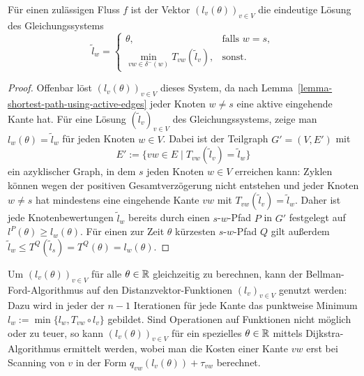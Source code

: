 \begin{proposition}\label{prop-arrival-times-vector}
	Für einen zulässigen Fluss $f$ ist der Vektor $(l_v(\theta))_{v\in V}$ die eindeutige Lösung des Gleichungssystems
	\[ \tilde{l}_w = \begin{cases}
	\theta, & \text{falls } w=s, \\
	\min\limits_{vw\in \delta^-(w)} T_{vw}(\tilde{l}_v), & \text{sonst}.
	\end{cases} \]
\end{proposition}
\begin{proof}
	Offenbar löst $(l_v(\theta))_{v\in V}$ dieses System, da nach Lemma~\ref{lemma-shortest-path-using-active-edges} jeder Knoten $w\neq s$ eine aktive eingehende Kante hat.
	Für eine Lösung $(\tilde{l}_v)_{v\in V}$ des Gleichungssystems, zeige man $l_w(\theta) = \tilde{l}_w$ für jeden Knoten $w\in V$.
	Dabei ist der Teilgraph $G'=(V, E')$ mit
	\[ E' := \{ vw \in E \mid T_{vw}(\tilde{l}_v ) = \tilde{l}_w \} \]
	ein azyklischer Graph, in dem $s$ jeden Knoten $w\in V$ erreichen kann:
	Zyklen können wegen der positiven Gesamtverzögerung nicht entstehen und jeder Knoten $w\neq s$ hat mindestens eine eingehende Kante $vw$ mit $T_{vw}(\tilde{l}_v) = \tilde{l}_w$.
	Daher ist jede Knotenbewertungen $\tilde{l}_w$ bereits durch einen $s$-$w$-Pfad $P$ in $G'$ festgelegt auf $l^P(\theta)\geq l_w(\theta)$.
	Für einen zur Zeit $\theta$ kürzesten $s$-$w$-Pfad $Q$ gilt außerdem $\tilde{l}_w \leq T^Q(\tilde{l}_s) = T^Q(\theta) = l_w(\theta)$.
\end{proof}

Um $(l_v(\theta))_{v\in V}$ für alle $\theta\in\mathbb{R}$ gleichzeitig zu berechnen, kann der Bellman-Ford-Algorithmus auf den Distanzvektor-Funktionen $(l_v)_{v\in V}$ genutzt werden:
Dazu wird in jeder der $n-1$ Iterationen für jede Kante das punktweise Minimum $l_w := \min\{ l_w, T_{vw}\circ l_v \}$ gebildet.
Sind Operationen auf Funktionen nicht möglich oder zu teuer, so kann $(l_v(\theta))_{v\in V}$ für ein spezielles $\theta\in\mathbb{R}$ mittels Dijkstra-Algorithmus ermittelt werden, wobei man die Kosten einer Kante $vw$ erst bei Scanning von $v$ in der Form $q_{vw}(l_v(\theta)) + \tau_{vw}$ berechnet.
